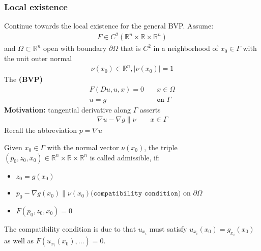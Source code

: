 \subsubsection*{Local existence}
Continue towards the local existence for the general BVP. Assume:
\begin{align*}
	F \in C^2(\mathbb{R}^n \times \mathbb{R} \times \mathbb{R}^n)
\end{align*}
and $\Omega \subset \mathbb{R}^n$ open with boundary $\partial \Omega$ that is $C^2$ in a neighborhood of $x_0 \in \Gamma$ with the unit outer normal
\begin{align*}
	\nu(x_0) \in \mathbb{R}^n, |\nu(x_0)| = 1
\end{align*}
The \textbf{(BVP)}
\begin{align*}
	F(Du, u, x) = 0 &\quad x \in \Omega\\
	u = g &\quad \texttt{on } \Gamma
\end{align*}
\textbf{Motivation:}
tangential derivative along $\Gamma$ asserts 
\begin{align*}
	\nabla u - \nabla g \| \nu \qquad x \in \Gamma
\end{align*}
Recall the abbreviation $p = \nabla u$

\begin{definition}
	Given $x_0 \in \Gamma$ with the normal vector $\nu(x_0)$, the triple $(p_0, z_0, x_0) \in \mathbb{R}^n \times \mathbb{R} \times \mathbb{R}^n$ is called admissible, if:
	\begin{itemize}
		\item $z_0 = g(x_0)$
		\item $p_0 - \nabla g(x_0) \| \nu(x_0)\texttt{(compatibility condition)}$ on $\partial\Omega$
		\item $F(p_0, z_0, x_0) =0$
	\end{itemize}
	The compatibility condition is due to that $u_{x_i}$ must satisfy $u_{x_i}(x_0) = g_{x_i}(x_0)$ as well as $F(u_{x_i}(x_0), \dots) = 0$. 
\end{definition}

